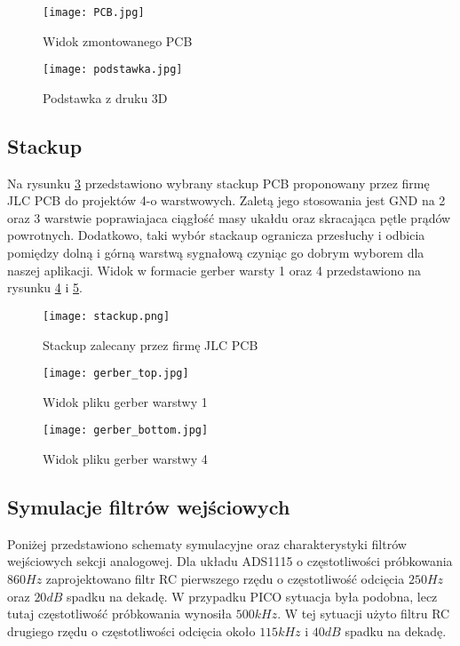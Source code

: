 \begin{figure}[H]
        \centering
        \texttt{[image: PCB.jpg]}
        \caption{Widok zmontowanego PCB}
        \label{fig:PCB}
    \end{figure}

    \begin{figure}[H]
        \centering
        \texttt{[image: podstawka.jpg]}
        \caption{Podstawka z druku 3D}
        \label{fig:podstawka}
    \end{figure}
    
    
\subsection{Stackup}
    Na rysunku \ref{fig:stackup} przedstawiono wybrany stackup PCB proponowany przez firmę JLC PCB do projektów 4-o warstwowych.
    Zaletą jego stosowania jest GND na 2 oraz 3 warstwie poprawiajaca ciągłość masy ukałdu oraz skracająca pętle
    prądów powrotnych. Dodatkowo, taki wybór stackaup ogranicza przesłuchy i odbicia pomiędzy dolną i górną warstwą sygnałową
    czyniąc go dobrym wyborem dla naszej aplikacji. Widok w formacie gerber warsty 1 oraz 4 przedstawiono
    na rysunku \ref{fig:gerber_top} i \ref{fig:gerber_bottom}. 
    \begin{figure}[H]
        \centering
        \texttt{[image: stackup.png]}
        \caption{Stackup zalecany przez firmę JLC PCB}
        \label{fig:stackup}
    \end{figure}

    \begin{figure}[H]
        \centering
        \texttt{[image: gerber\_top.jpg]}
        \caption{Widok pliku gerber warstwy 1 }
        \label{fig:gerber_top}
    \end{figure}

    \begin{figure}[H]
        \centering
        \texttt{[image: gerber\_bottom.jpg]}
        \caption{Widok pliku gerber warstwy 4 }
        \label{fig:gerber_bottom}
    \end{figure}


\subsection{Symulacje filtrów wejściowych}
Poniżej przedstawiono schematy symulacyjne oraz charakterystyki filtrów wejściowych sekcji analogowej.
Dla układu ADS1115 o częstotliwości próbkowania $860Hz$ zaprojektowano filtr RC pierwszego rzędu o częstotliwość odcięcia $250Hz$ oraz $20dB$ spadku na dekadę.
W przypadku PICO sytuacja była podobna, lecz tutaj częstotliwość próbkowania wynosiła $500kHz$.
W tej sytuacji użyto filtru RC drugiego rzędu o częstotliwości odcięcia około $115kHz$ i $40dB$ spadku na dekadę.


